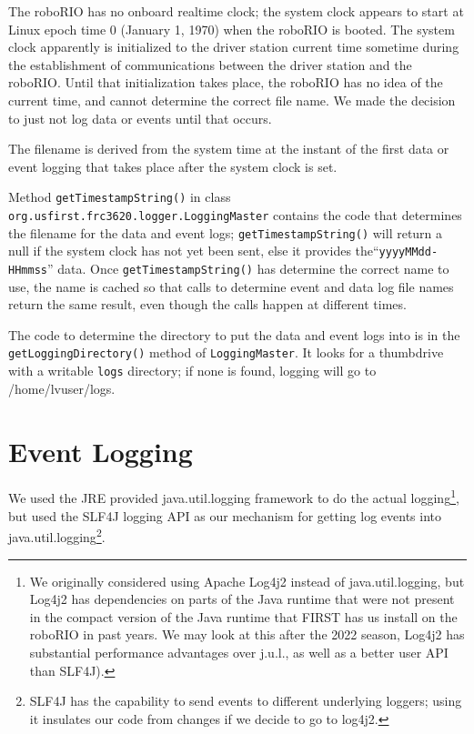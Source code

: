 \documentclass[]{article}
\newcommand{\zztt}[1]{{\texttt{\footnotesize{#1}}}}
\begin{document}
The roboRIO has no onboard realtime clock; the system clock appears to start at Linux epoch time 0 (January 1, 1970) when the roboRIO is booted.
The system clock apparently is initialized to the driver station current time sometime during the establishment of communications between the driver station and the roboRIO.
Until that initialization takes place, the roboRIO has no idea of the current time, and cannot determine the correct file name. We made the decision to just not log data or events until that occurs.

The filename is derived from the system time at the instant of the first data or event logging that takes place after the system clock is set. 

Method \zztt{getTimestampString()} in class \zztt{org.usfirst.frc3620.logger.LoggingMaster} contains the code that determines the filename for the data and event logs;
\zztt{getTimestampString()} will return a null if the system clock has not yet been sent, else it provides the\mbox{``\zztt{yyyyMMdd-HHmmss}''} data.
Once \zztt{getTimestampString()} has determine the correct name to use, the name is cached so that calls to determine event and data log file names return the same result, even though the calls happen at different times.

The code to determine the directory to put the data and event logs into is in the \zztt{getLoggingDirectory()} method of \zztt{LoggingMaster}.
It looks for a thumbdrive with a writable \zztt{logs} directory; if none is found, logging will go to /home/lvuser/logs.

\section {Event Logging}

We used the JRE provided java.util.logging framework to do the actual logging\footnote {
We originally considered using Apache Log4j2 instead of java.util.logging, but Log4j2 has dependencies on parts of the Java runtime that were not present in the compact version of the Java runtime that FIRST has us install on the roboRIO in past years. We may look at this after the 2022 season, Log4j2 has substantial performance advantages over j.u.l., as well as a better user API than SLF4J).
}, but used the SLF4J logging API as our mechanism for getting log events into java.util.logging\footnote{SLF4J has the capability to send events to different underlying loggers; using it insulates our code from changes if we decide to go to log4j2.}.
\end{document}

